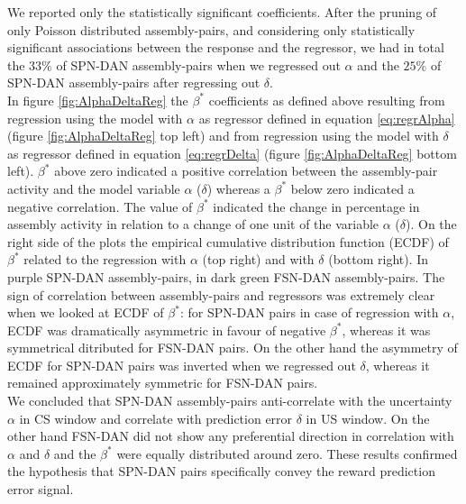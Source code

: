 We reported only the statistically significant coefficients. After the pruning of only Poisson distributed assembly-pairs, and considering only statistically significant associations between the response and the regressor, we had in total the $33\%$ of SPN-DAN assembly-pairs when we regressed out $\alpha$ and the $25\%$ of SPN-DAN assembly-pairs after regressing out $\delta$.\\In figure \ref{fig:AlphaDeltaReg} the $\beta^*$ coefficients as defined above resulting from regression using the model with $\alpha$ as regressor defined in equation \ref{eq:regrAlpha} (figure \ref{fig:AlphaDeltaReg} top left) and from regression using the model with $\delta$ as regressor defined in equation \ref{eq:regrDelta} (figure \ref{fig:AlphaDeltaReg} bottom left). $\beta^*$ above zero indicated a positive correlation between the assembly-pair activity and the model variable $\alpha$ ($\delta$) whereas a $\beta^*$ below zero indicated a negative correlation. The value of $\beta^*$ indicated the change in percentage in assembly activity in relation to a change of one unit of the variable $\alpha$ ($\delta$). On the right side of the plots the empirical cumulative distribution function (ECDF) of $\beta^*$ related to the regression with $\alpha$ (top right) and with $\delta$ (bottom right). In purple SPN-DAN assembly-pairs, in dark green FSN-DAN assembly-pairs. The sign of correlation between assembly-pairs and regressors was extremely clear when we looked at ECDF of $\beta^*$: for SPN-DAN pairs in case of regression with $\alpha$, ECDF was dramatically asymmetric in favour of negative $\beta^*$, whereas it was symmetrical ditributed for FSN-DAN pairs. On the other hand the asymmetry of ECDF for SPN-DAN pairs was inverted when we regressed out $\delta$, whereas it remained approximately symmetric for FSN-DAN pairs.\\We concluded that SPN-DAN assembly-pairs anti-correlate with the uncertainty $\alpha$ in CS window and correlate with prediction error $\delta$ in US window. On the other hand FSN-DAN did not show any preferential direction in correlation with $\alpha$ and $\delta$ and the $\beta^*$ were equally distributed around zero. These results confirmed the hypothesis that SPN-DAN pairs specifically convey the reward prediction error signal.
